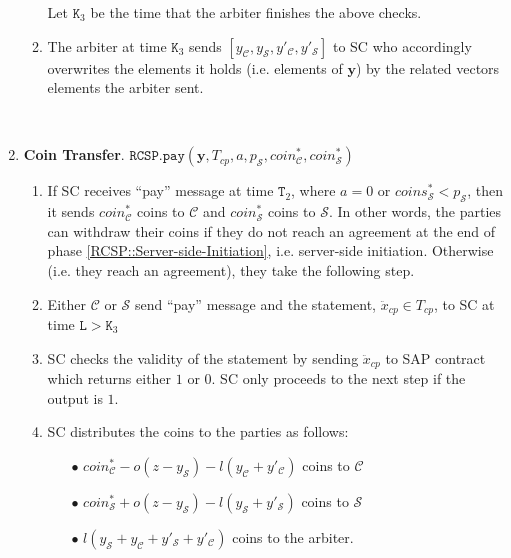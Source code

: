 \begin{enumerate}
\begin{enumerate}
 
Let $\texttt{K}_{\scriptscriptstyle 3}$ be the time that the arbiter finishes the above checks.

\item The arbiter at time $\texttt{K}_{\scriptscriptstyle 3}$ sends $[y_{\scriptscriptstyle\mathcal C},y_{\scriptscriptstyle\mathcal S},  y'_{\scriptscriptstyle\mathcal C},y'_{\scriptscriptstyle\mathcal S}]$  to SC who accordingly overwrites the  elements it holds (i.e. elements of $\bm{y}$) by  the related vectors elements the arbiter sent.  
\end{enumerate}

\

\item \textbf{Coin Transfer}\label{RCSP::CoinTransfer}. $\mathtt{RCSP}.\mathtt{pay}(\bm{y},T_{\scriptscriptstyle cp},a,p_{\scriptscriptstyle\mathcal S}, coin^{\scriptscriptstyle *}_{\scriptscriptstyle\mathcal C},coin^{\scriptscriptstyle *}_{\scriptscriptstyle\mathcal S})$
\begin{enumerate}
 
 \item If SC  receives  ``pay'' message  at time $\texttt{T}_{2}$, where $a=0$ or $coins^{*}_{\scriptscriptstyle\mathcal{S}}<p_{\scriptscriptstyle\mathcal{S}}$, then it sends $coin^{\scriptscriptstyle *}_{\scriptscriptstyle\mathcal C}$ coins to $\mathcal C$ and $coin^{\scriptscriptstyle *}_{\scriptscriptstyle\mathcal S}$ coins to $\mathcal S$. In other words, the parties can withdraw their coins if they do not reach an agreement at the end of   phase \ref{RCSP::Server-side-Initiation}, i.e. server-side initiation.  Otherwise (i.e. they reach an agreement), they take the following step. 

\item Either $\mathcal C$ or $\mathcal S$ send ``pay'' message and the statement, $\ddot{x}_{\scriptscriptstyle cp}\in T_{\scriptscriptstyle cp}$,  to SC at time $\texttt{L}>\texttt{K}_{\scriptscriptstyle 3}$
\item SC checks the validity of the statement by sending $\ddot{x}_{\scriptscriptstyle cp}$ to SAP contract which  returns  either $1$ or $0$. SC only proceeds to the next step if the output is $1$. 
\item SC distributes the coins to the parties as follows:

\begin{itemize}
\item[$\bullet$]   $coin^{\scriptscriptstyle *}_{\scriptscriptstyle\mathcal C}-o(z-y_{\scriptscriptstyle\mathcal S})-l(y_{\scriptscriptstyle\mathcal C}+y'_{\scriptscriptstyle\mathcal C})$ coins  to $\mathcal C$
\item[$\bullet$] $coin^{\scriptscriptstyle *}_{\scriptscriptstyle\mathcal S}+o(z-y_{\scriptscriptstyle\mathcal S})-l(y_{\scriptscriptstyle\mathcal S}+y'_{\scriptscriptstyle\mathcal S})$ coins to $\mathcal S$
\item[$\bullet$] $l(y_{\scriptscriptstyle\mathcal S}+y_{\scriptscriptstyle\mathcal C}+y'_{\scriptscriptstyle\mathcal S}+y'_{\scriptscriptstyle\mathcal C})$ coins to the arbiter.  
\end{itemize}


\end{enumerate}
\end{enumerate}
